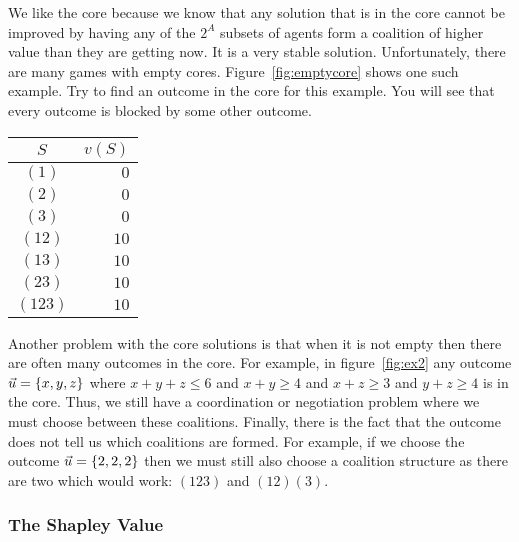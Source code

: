 We like the core because we know that any solution that is in the core
cannot be improved by having any of the $2^A$ subsets of agents form a
coalition of higher value than they are getting now. It is a very
stable solution. Unfortunately, there are many games with empty cores.
Figure~\ref{fig:emptycore} shows one such example. Try to find an
outcome in the core for this example. You will see that every outcome
is blocked by some other outcome.

\begin{SCfigure}
  \begin{minipage}{1.0\linewidth}
  \centering
  \begin{tabular}{cr} \toprule
    $S$ & $v(S)$ \\ \midrule
    $(1)$ & \emph{$0$} \\ 
    $(2)$ & \emph{$0$}\\ 
    $(3)$ & \emph{$0$}\\ 
    $(12)$& \emph{$10$}\\
    $(13)$& \emph{$10$}\\
    $(23)$& \emph{$10$}\\
    $(123)$& \emph{$10$}\\ \bottomrule
  \end{tabular}
  \end{minipage}
  \caption{Set of payments for a game with an empty core}
  \label{fig:emptycore}
\end{SCfigure}


Another problem with the core solutions is that when it is not empty
then there are often many outcomes in the core. For example, in
figure~\ref{fig:ex2} any outcome $\vec{u} = \{x,y,z\}$ where $x + y + z
\leq 6$ and $x + y \geq 4$ and $x + z \geq 3$ and $y + z \geq 4$ is in
the core. Thus, we still have a coordination or negotiation problem
where we must choose between these coalitions. Finally, there is the
fact that the outcome does not tell us which coalitions are
formed. For example, if we choose the outcome $\vec{u} = \{2,2,2\}$ then
we must still also choose a coalition structure as there are two
which would work: $(123)$ and $(12)(3)$.


\subsubsection{The Shapley Value}

